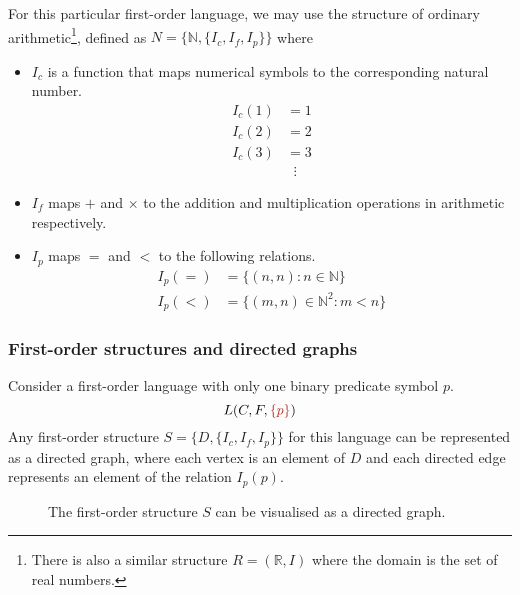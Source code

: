 For this particular first-order language, we may use the structure of ordinary arithmetic\footnote{There is also a similar structure \(R = (\mathbb{R}, I)\) where the domain is the set of real numbers.}, defined as \(N = \{\mathbb{N}, \{I_c, I_f, I_p\}\}\) where
%
\begin{itemize}
    \item \(I_c\) is a function that maps numerical symbols to the corresponding natural number.
    \begin{align*}
        I_c (1) &= 1\\
        I_c (2) &= 2\\
        I_c (3) &= 3\\
        &\;\;\vdots
    \end{align*}

    \item \(I_f\) maps \(+\) and \(\times\) to the addition and multiplication operations in arithmetic respectively.
    
    \item \(I_p\) maps \(=\) and \(<\) to the following relations.
    \begin{align*}
        I_p (=) &= \{(n, n) : n \in \mathbb{N}\}\\
        I_p (<) &= \{(m, n) \in \mathbb{N}^2 : m < n\}
    \end{align*}
\end{itemize}



\subsubsection{First-order structures and directed graphs}

Consider a first-order language with only one binary predicate symbol \(p\).
%
\[L(C, F, {\color{BrickRed} \{p\}})\]
%
Any first-order structure \(S = \{D, \{I_c, I_f, I_p\}\}\) for this language can be represented as a directed graph, where each vertex is an element of \(D\) and each directed edge represents an element of the relation \(I_p (p)\).

\begin{figure}[H]
    \centering
    \caption{The first-order structure \(S\) can be visualised as a directed graph.}
    \label{fig:Ch01-first-order-structure-as-directed-graph}
\end{figure}